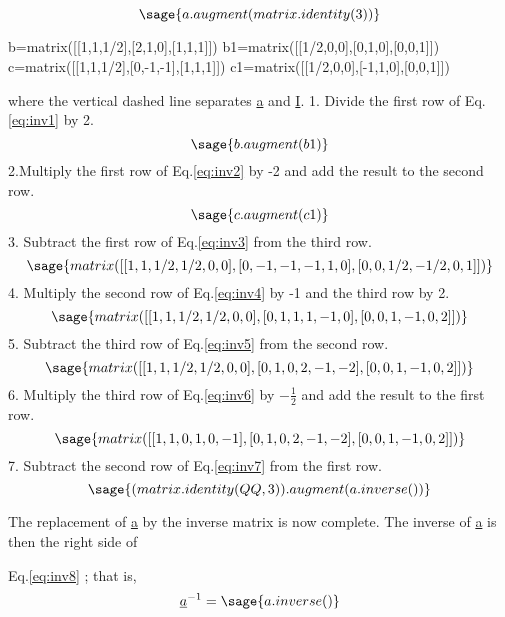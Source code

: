 \documentclass[12pt]{report}
\newcommand{\lab}[1]{
Eq.\ref{#1}
}
\begin{document}
\begin{equation}\sage{a.augment(matrix.identity(3))}\label{eq:inv1}\end{equation}
\begin{sagesilent}
b=matrix([[1,1,1/2],[2,1,0],[1,1,1]])
b1=matrix([[1/2,0,0],[0,1,0],[0,0,1]])
c=matrix([[1,1,1/2],[0,-1,-1],[1,1,1]])
c1=matrix([[1/2,0,0],[-1,1,0],[0,0,1]])
\end{sagesilent}
where the vertical dashed line separates \underline{a} and \underline{I}.
1. Divide the first row of \lab{eq:inv1} by 2.
\begin{equation}\sage{b.augment(b1)}\label{eq:inv2}\end{equation}
2.Multiply the first row of \lab{eq:inv2} by -2 and add the result to
the second row.
\begin{equation}\sage{c.augment(c1)}\label{eq:inv3}\end{equation}
3. Subtract the first row of \lab{eq:inv3} from the third row.
\begin{equation}\sage{matrix([[1,1,1/2,1/2,0,0],[0,-1,-1,-1,1,0],[0,0,1/2,-1/2,0,1]])}\label{eq:inv4}\end{equation}
4. Multiply the second row of \lab{eq:inv4} by -1 and the third row by 2.
\begin{equation}\sage{matrix([[1,1,1/2,1/2,0,0],[0,1,1,1,-1,0],[0,0,1,-1,0,2]])}\label{eq:inv5}\end{equation}
5. Subtract the third row of \lab{eq:inv5} from the second row.
\begin{equation}\sage{matrix([[1,1,1/2,1/2,0,0],[0,1,0,2,-1,-2],[0,0,1,-1,0,2]])}\label{eq:inv6}\end{equation}
6. Multiply the third row of \lab{eq:inv6} by $-\frac{1}{2}$ and add the
result to the first row.
\begin{equation}\sage{matrix([[1,1,0,1,0,-1],[0,1,0,2,-1,-2],[0,0,1,-1,0,2]])}\label{eq:inv7}\end{equation}
7. Subtract the second row of \lab{eq:inv7} from the first row.
\begin{equation} \sage{(matrix.identity(QQ,3)).augment(a.inverse())}\label{eq:inv8}\end{equation}

The replacement of \underline{a} by the inverse matrix is now
complete. The inverse of \underline{a} is then the right side of
\lab{eq:inv8}; that is,
\begin{equation}\underline{a}^{-1} = \sage{a.inverse()}\end{equation}
\end{document}
